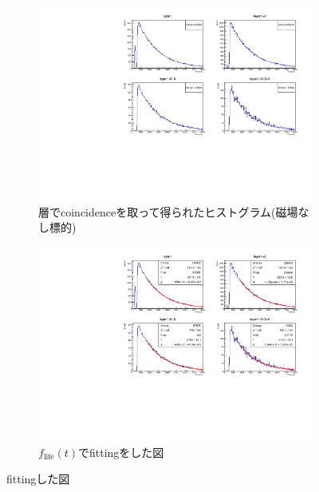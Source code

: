   \begin{figure}[H]
   \centering
   \begin{subfigure}{\columnwidth}
    \centering
    \includegraphics[height = 0.9\columnwidth , angle = -90]{figure/ikemitsu/lt_layercoin.pdf}
    \caption{層でcoincidenceを取って得られたヒストグラム(磁場なし標的)}
    \label{lt_layercoin}
   \end{subfigure}
   \begin{subfigure}{\columnwidth}
    \centering
    \includegraphics[height = 0.9\columnwidth , angle = -90]{figure/ikemitsu/lt_layercoin_fit.pdf}
    \caption{$f_{\mathrm{life}}(t)$でfittingをした図}
    \label{lt_layercoin_fit}
   \end{subfigure}
   \caption{fittingした図}
   \label{lt_layercoin_all}
  \end{figure}
  
